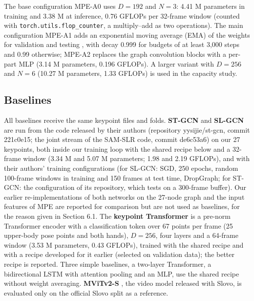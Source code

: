 The base configuration MPE-A0 uses \(D = 192\) and \(N = 3\): 4.41 M parameters in training and 3.38 M at inference, 0.76 GFLOPs per 32-frame window (counted with \texttt{torch.utils.flop\_counter}, a multiply--add as two operations). The main configuration MPE-A1 adds an exponential moving average (EMA) of the weights for validation and testing \citep{1992_polyak_averaging}, with decay 0.999 for budgets of at least 3,000 steps and 0.99 otherwise; MPE-A2 replaces the graph convolution blocks with a per-part MLP (3.14 M parameters, 0.196 GFLOPs). A larger variant with \(D = 256\) and \(N = 6\) (10.27 M parameters, 1.33 GFLOPs) is used in the capacity study.

\hypertarget{baselines}{%
\subsection{Baselines}\label{baselines}}

All baselines receive the same keypoint files and folds. \textbf{ST-GCN} \citep{2018_yan_stgcn} and \textbf{SL-GCN} \citep{2021_jiang_sam_slr} are run from the code released by their authors (repository yysijie/st-gcn, commit 221c0e15; the joint stream of the SAM-SLR code, commit de6c53a6) on our 27 keypoints, both inside our training loop with the shared recipe below and a 32-frame window (3.34 M and 5.07 M parameters; 1.98 and 2.19 GFLOPs), and with their authors' training configurations (for SL-GCN: SGD, 250 epochs, random 100-frame windows in training and 150 frames at test time, DropGraph; for ST-GCN: the configuration of its repository, which tests on a 300-frame buffer). Our earlier re-implementations of both networks on the 27-node graph and the input features of MPE are reported for comparison but are not used as baselines, for the reason given in Section 6.1. The \textbf{keypoint Transformer} is a pre-norm Transformer encoder \citep{2017_vaswani_attention} with a classification token over 67 points per frame (25 upper-body pose points and both hands), \(D = 256\), four layers and a 64-frame window (3.53 M parameters, 0.43 GFLOPs), trained with the shared recipe and with a recipe developed for it earlier (selected on validation data); the better recipe is reported. Three simple baselines, a two-layer Transformer, a bidirectional LSTM with attention pooling and an MLP, use the shared recipe without weight averaging. \textbf{MViTv2-S} \citep{2022_li_mvitv2}, the video model released with Slovo, is evaluated only on the official Slovo split as a reference.

